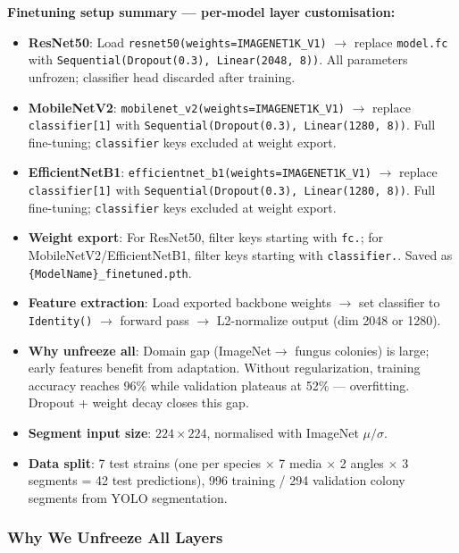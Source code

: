 \medskip
\noindent\textbf{Finetuning setup summary --- per-model layer customisation:}
\vspace{-0.3em}
\begin{itemize}[nosep,leftmargin=*]
\item \textbf{ResNet50}: Load \texttt{resnet50(weights=IMAGENET1K\_V1)} $\rightarrow$ replace \texttt{model.fc} with \texttt{Sequential(Dropout(0.3), Linear(2048, 8))}. All parameters unfrozen; classifier head discarded after training.
\item \textbf{MobileNetV2}: \texttt{mobilenet\_v2(weights=IMAGENET1K\_V1)} $\rightarrow$ replace \texttt{classifier[1]} with \texttt{Sequential(Dropout(0.3), Linear(1280, 8))}. Full fine-tuning; \texttt{classifier} keys excluded at weight export.
\item \textbf{EfficientNetB1}: \texttt{efficientnet\_b1(weights=IMAGENET1K\_V1)} $\rightarrow$ replace \texttt{classifier[1]} with \texttt{Sequential(Dropout(0.3), Linear(1280, 8))}. Full fine-tuning; \texttt{classifier} keys excluded at weight export.
\item \textbf{Weight export}: For ResNet50, filter keys starting with \texttt{fc.}; for MobileNetV2/EfficientNetB1, filter keys starting with \texttt{classifier.}. Saved as \texttt{\{ModelName\}\_finetuned.pth}.
\item \textbf{Feature extraction}: Load exported backbone weights $\rightarrow$ set classifier to \texttt{Identity()} $\rightarrow$ forward pass $\rightarrow$ L2-normalize output (dim 2048 or 1280).
\item \textbf{Why unfreeze all}: Domain gap (ImageNet$\rightarrow$ fungus colonies) is large; early features benefit from adaptation. Without regularization, training accuracy reaches 96\% while validation plateaus at 52\% --- overfitting. Dropout + weight decay closes this gap.
\item \textbf{Segment input size}: $224\times224$, normalised with ImageNet $\mu/\sigma$.
\item \textbf{Data split}: 7 test strains (one per species $\times$ 7 media $\times$ 2 angles $\times$ 3 segments = 42 test predictions), 996 training / 294 validation colony segments from YOLO segmentation.
\end{itemize}

\subsubsection{Why We Unfreeze All Layers}

